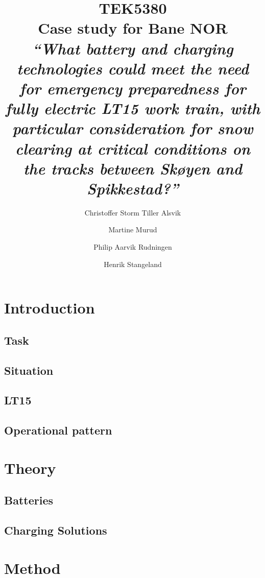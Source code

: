 \documentclass{article}
\title{ \small TEK5380 \\
\LARGE Case study for Bane NOR \\
\vspace*{5mm} \small \textit{“What battery and charging technologies could meet the need for emergency preparedness for fully electric LT15 work train, with particular consideration for snow clearing at critical conditions on the tracks between Skøyen and Spikkestad?”}
}
\author{Christoffer Storm Tiller Alsvik \and Martine Murud \and Philip Aarvik Rudningen \and Henrik Stangeland}
\date{}
\begin{document}
\maketitle

\pagebreak

\section{Introduction}

    \lipsum[1-1]

    \subsection{Task}

        \lipsum[1-1]

    \subsection{Situation}

        \lipsum[1-1]

    \subsection{LT15}

        \lipsum[1-1]

    \subsection{Operational pattern}

        \lipsum[1-1]

\section{Theory}

    \lipsum[1-1]

    \subsection{Batteries}

        \lipsum[1-1]

    \subsection{Charging Solutions}

        \lipsum[1-1]

\section{Method}
\end{document}
